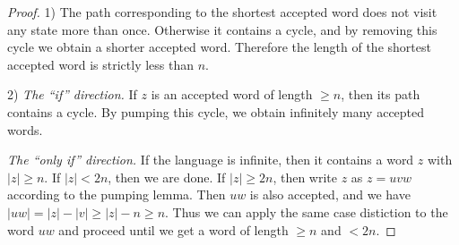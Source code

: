 

\setcounter{section}{3}
\setcounter{subsection}{3}
\setcounter{dfn}{7}

\begin{proof}
1) The path corresponding to the shortest accepted word does not visit any state more than once.
Otherwise it contains a cycle, and by removing this cycle we obtain a shorter accepted word.
Therefore the length of the shortest accepted word is strictly less than $n$.

2) \emph{The ``if'' direction.} If $z$ is an accepted word of length $\ge n$, then its path contains a cycle.
By pumping this cycle, we obtain infinitely many accepted words.

\emph{The ``only if'' direction.} If the language is infinite, then it contains a word $z$ with $|z| \ge n$.
If $|z| < 2n$, then we are done.
If $|z| \ge 2n$, then write $z$ as $z = uvw$ according to the pumping lemma.
Then $uw$ is also accepted, and we have $|uw| = |z| - |v| \ge |z| - n \ge n$.
Thus we can apply the same case distiction to the word $uw$ and proceed until we get a word of length $\ge n$ and $< 2n$.
\end{proof}




